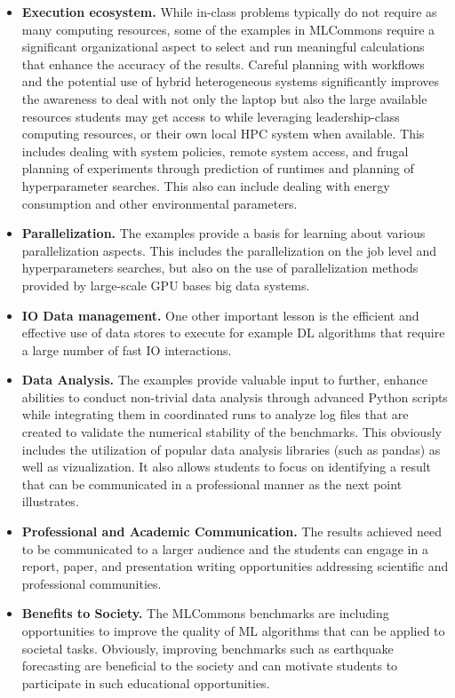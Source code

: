 \documentclass[utf8]{FrontiersinVancouver} %
\begin{document}
\begin{itemize}
  \item {\bf Execution ecosystem.} While in-class problems typically
    do not require as many computing resources, some of the examples in
    MLCommons require a significant organizational aspect to select
    and run meaningful calculations that enhance the accuracy of the
    results. Careful planning with workflows and the potential use
    of hybrid heterogeneous systems significantly improves the
    awareness to deal with not only the laptop but also the large
    available resources students may get access to while leveraging
    leadership-class computing resources, or their own local HPC
    system when available. This includes dealing with system policies,
    remote system access, and frugal planning of experiments through
    prediction of runtimes and planning of hyperparameter searches. This
    also can include dealing with energy consumption and other
    environmental parameters.

  \item {\bf Parallelization.} The examples provide a basis for
    learning about various parallelization aspects. This includes the
    parallelization on the job level and hyperparameters searches, but
    also on the use of parallelization methods provided by large-scale
    GPU bases big data systems.

  \item {\bf IO Data management.} One other important lesson is the
    efficient and effective use of data stores to execute for example
    DL algorithms that require a large number of fast IO interactions.

  \item {\bf Data Analysis.} The examples provide valuable input to
    further, enhance abilities to conduct non-trivial data analysis
    through advanced Python scripts while integrating them in
    coordinated runs to analyze log files that are created to
    validate the numerical stability of the benchmarks. This obviously
    includes the utilization of popular data analysis libraries (such
    as pandas) as well as vizualization. It also allows students to
    focus on identifying a result that can be communicated in a
    professional manner as the next point illustrates.


  \item {\bf Professional and Academic Communication.} The results
    achieved need to be communicated to a larger audience and the
    students can engage in a report, paper, and
    presentation writing opportunities addressing scientific and
    professional communities.

  \item {\bf Benefits to Society.} The MLCommons benchmarks are
    including opportunities to improve the quality of ML algorithms
    that can be applied to societal tasks. Obviously, improving
    benchmarks such as earthquake forecasting are beneficial to the
    society and can motivate students to participate in such
    educational opportunities.

\end{itemize}
\end{document}
